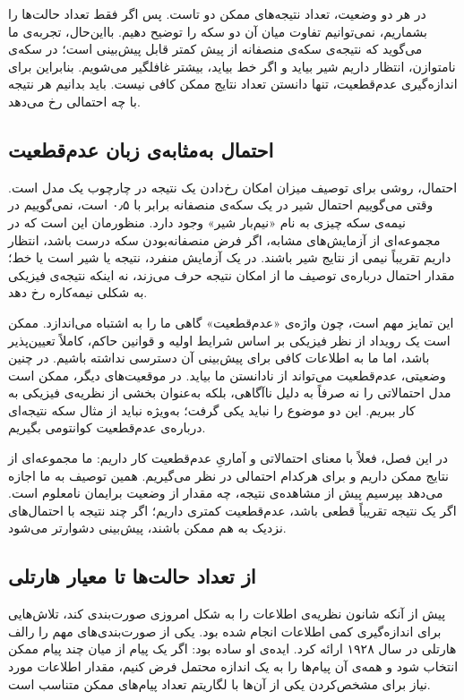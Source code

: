 در هر دو وضعیت، تعداد نتیجه‌های ممکن دو تاست. پس اگر فقط تعداد حالت‌ها را بشماریم، نمی‌توانیم تفاوت میان آن دو سکه را توضیح دهیم. بااین‌حال، تجربه‌ی ما می‌گوید که نتیجه‌ی سکه‌ی منصفانه از پیش کمتر قابل پیش‌بینی است؛ در سکه‌ی نامتوازن، انتظار داریم شیر بیاید و اگر خط بیاید، بیشتر غافلگیر می‌شویم. بنابراین برای اندازه‌گیری عدم‌قطعیت، تنها دانستن تعداد نتایج ممکن کافی نیست. باید بدانیم هر نتیجه با چه احتمالی رخ می‌دهد.

\subsection{احتمال به‌مثابه‌ی زبان عدم‌قطعیت}
\label{sub:probability-language}

احتمال، روشی برای توصیف میزان امکان رخ‌دادن یک نتیجه در چارچوب یک مدل است. وقتی می‌گوییم احتمال شیر در یک سکه‌ی منصفانه برابر با ۰٫۵ است، نمی‌گوییم در نیمه‌ی سکه چیزی به نام «نیم‌بار شیر» وجود دارد. منظورمان این است که در مجموعه‌ای از آزمایش‌های مشابه، اگر فرض منصفانه‌بودن سکه درست باشد، انتظار داریم تقریباً نیمی از نتایج شیر باشند. در یک آزمایش منفرد، نتیجه یا شیر است یا خط؛ مقدار احتمال درباره‌ی توصیف ما از امکان نتیجه حرف می‌زند، نه اینکه نتیجه‌ی فیزیکی به شکلی نیمه‌کاره رخ دهد.

این تمایز مهم است، چون واژه‌ی «عدم‌قطعیت» گاهی ما را به اشتباه می‌اندازد. ممکن است یک رویداد از نظر فیزیکی بر اساس شرایط اولیه و قوانین حاکم، کاملاً تعیین‌پذیر باشد، اما ما به اطلاعات کافی برای پیش‌بینی آن دسترسی نداشته باشیم. در چنین وضعیتی، عدم‌قطعیت می‌تواند از نادانستن ما بیاید. در موقعیت‌های دیگر، ممکن است مدل احتمالاتی را نه صرفاً به دلیل ناآگاهی، بلکه به‌عنوان بخشی از نظریه‌ی فیزیکی به کار ببریم. این دو موضوع را نباید یکی گرفت؛ به‌ویژه نباید از مثال سکه نتیجه‌ای درباره‌ی عدم‌قطعیت کوانتومی بگیریم. \autocite{jaynes2003,cover2006}

در این فصل، فعلاً با معنای احتمالاتی و آماریِ عدم‌قطعیت کار داریم: ما مجموعه‌ای از نتایج ممکن داریم و برای هرکدام احتمالی در نظر می‌گیریم. همین توصیف به ما اجازه می‌دهد بپرسیم پیش از مشاهده‌ی نتیجه، چه مقدار از وضعیت برایمان نامعلوم است. اگر یک نتیجه تقریباً قطعی باشد، عدم‌قطعیت کمتری داریم؛ اگر چند نتیجه با احتمال‌های نزدیک به هم ممکن باشند، پیش‌بینی دشوارتر می‌شود.

\subsection{از تعداد حالت‌ها تا معیار هارتلی}
\label{sub:hartley-measure}

پیش از آنکه شانون نظریه‌ی اطلاعات را به شکل امروزی صورت‌بندی کند، تلاش‌هایی برای اندازه‌گیری کمی اطلاعات انجام شده بود. یکی از صورت‌بندی‌های مهم را رالف هارتلی در سال ۱۹۲۸ ارائه کرد. ایده‌ی او ساده بود: اگر یک پیام از میان چند پیام ممکن انتخاب شود و همه‌ی آن پیام‌ها را به یک اندازه محتمل فرض کنیم، مقدار اطلاعات مورد نیاز برای مشخص‌کردن یکی از آن‌ها با لگاریتم تعداد پیام‌های ممکن متناسب است. \autocite{hartley1928}

